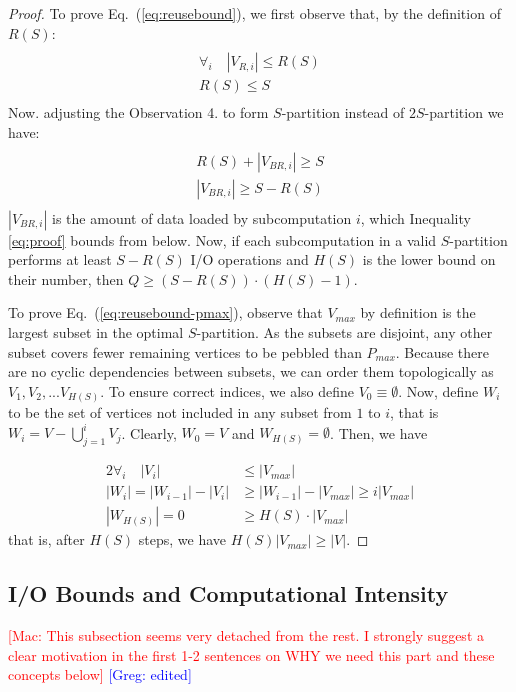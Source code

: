 \documentclass[sigplan,review,anonymous]{acmart}\settopmatter{printfolios=true,printccs=false,printacmref=false}
\newcommand\greg[1]{\textcolor{blue}{[Greg: #1]}}
\newcommand\mac[1]{\textcolor{red}{[Mac: #1]}}
\begin{document}
\begin{proof}
%
To prove Eq.~(\ref{eq:reusebound}), we first observe that, by the 
definition of 
$R(S)$:
\begin{multline}
\nonumber
\\
\forall_{i}\quad |V_{R,i}| \le R(S) \\
R(S) \le S \\
\end{multline}
Now. adjusting the Observation 4. to form $S$-partition instead of 
$2S$-partition we have:
\begin{multline}
\label{eq:proof}
\\
	R(S) + |V_{BR,i}| \ge S\\
	|V_{BR,i}| \ge S - R(S)\\
\end{multline}
$|V_{BR,i}|$ is the amount of data loaded by subcomputation $i$, which 
Inequality \ref{eq:proof} bounds from below. Now, if each subcomputation in a 
valid $S$-partition performs at least $S - R(S)$ I/O operations and $H(S)$ is 
the lower bound on their number, then $Q \ge (S - R(S)) \cdot (H(S) - 1)$.

To prove Eq.~(\ref{eq:reusebound-pmax}), observe that $V_{max}$ by definition
is the largest subset in the optimal $S$-partition. As the subsets are
disjoint, any other subset covers fewer remaining vertices to be pebbled than
$P_{max}$. Because there are no cyclic dependencies between subsets, we can
order them topologically as $V_1, V_2, ...V_{H(S)}$. To ensure correct indices,
we also define $V_0 \equiv \emptyset$. Now, define $W_i$ to be the set
of vertices not included in any subset from $1$ to $i$, that is $W_i = V -
\bigcup_{j=1}^{i} V_j$. Clearly, $W_0 = V$ and $W_{H(S)} = \emptyset$. Then, we
have

\begin{alignat}{2}
%
\nonumber
\forall_{i}\quad |V_i| & \le |V_{max}| \\
\nonumber
|W_i| = |W_{i-1}| - |V_i| & \ge |W_{i-1}| - |V_{max}| \ge i|V_{max}| \\
\nonumber
|W_{H(S)}| = 0 & \ge H(S) \cdot |V_{max}| 
%
\end{alignat}
%
that is, after $H(S)$ steps, we have $H(S) |V_{max}| \ge |V|$.
\end{proof}

\subsection{I/O Bounds and Computational Intensity}
\label{sec:compIntensity}
\mac{This subsection seems very detached from the rest. I strongly suggest
a clear motivation in the first 1-2 sentences on WHY we need this part
and these concepts below} \greg{edited}
\end{document}
